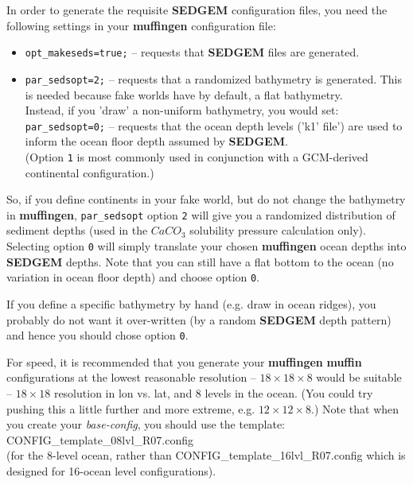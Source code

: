 \documentclass[11pt,fleqn]{book} %
\begin{document}
In order to generate the requisite \textbf{SEDGEM} configuration files, you need the following settings in your \textbf{muffingen} configuration file:

\begin{itemize}[noitemsep]
\vspace{1mm}
\item \texttt{opt\_makeseds=true;} --  requests that \textbf{SEDGEM} files are generated.
\vspace{1mm}
\item \texttt{par\_sedsopt=2;} -- requests that a randomized bathymetry is generated. This is needed because fake worlds have by default, a flat bathymetry.
\\Instead, if you 'draw' a non-uniform bathymetry, you would set:
\\ \texttt{par\_sedsopt=0;} -- requests that the ocean depth levels ('k1' file') are used to inform the ocean floor depth assumed by \textbf{SEDGEM}.
\\(Option \texttt{1} is most commonly used in conjunction with a GCM-derived continental configuration.)
\end{itemize}

So, if you define continents in your fake world, but do not change the bathymetry in \textbf{muffingen}, \texttt{par\_sedsopt} option \texttt{2} will give you a randomized distribution of sediment depths (used in the \(CaCO_{3}\) solubility pressure calculation only). Selecting option \texttt{0} will simply translate your chosen \textbf{muffingen} ocean depths into \textbf{SEDGEM} depths. Note that you can still have a flat bottom to the ocean (no variation in ocean floor depth) and choose option \texttt{0}.

If you define a specific bathymetry by hand (e.g. draw in ocean ridges), you probably do not want it over-written (by a random \textbf{SEDGEM} depth pattern) and hence you should chose option \texttt{0}.

For speed, it is recommended that you generate your \textbf{muffingen} \textbf{muffin} configurations at the lowest reasonable resolution -- \(18\times18\times8\) would be suitable -- \(18\times18\) resolution in lon vs. lat, and \(8\) levels in the ocean. (You could try pushing this a little further and more extreme, e.g. \(12\times12\times8\).) Note that when you create your \textit{base-config}, you should use the template:
\vspace{1mm}
\\\textsf{\footnotesize CONFIG\_template\_08lvl\_R07.config}
\vspace{1mm}
\\(for the 8-level ocean, rather than \textsf{\footnotesize CONFIG\_template\_16lvl\_R07.config } which is designed for 16-ocean level configurations).
\end{document}
